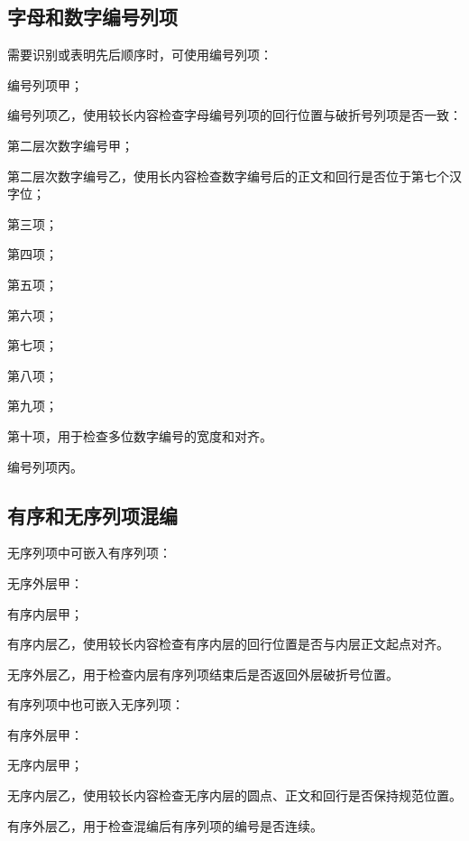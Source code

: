 \subsection{字母和数字编号列项}
需要识别或表明先后顺序时，可使用编号列项：
\begin{stdenum}
    \item 编号列项甲；
    \item 编号列项乙，使用较长内容检查字母编号列项的回行位置与破折号列项是否一致：
    \begin{stdenum}
        \item 第二层次数字编号甲；
        \item 第二层次数字编号乙，使用长内容检查数字编号后的正文和回行是否位于第七个汉字位；
        \item 第三项；
        \item 第四项；
        \item 第五项；
        \item 第六项；
        \item 第七项；
        \item 第八项；
        \item 第九项；
        \item 第十项，用于检查多位数字编号的宽度和对齐。
    \end{stdenum}
    \item 编号列项丙。
\end{stdenum}

\subsection{有序和无序列项混编}
无序列项中可嵌入有序列项：
\begin{stdlist}
    \item 无序外层甲：
    \begin{stdenum}
        \item 有序内层甲；
        \item 有序内层乙，使用较长内容检查有序内层的回行位置是否与内层正文起点对齐。
    \end{stdenum}
    \item 无序外层乙，用于检查内层有序列项结束后是否返回外层破折号位置。
\end{stdlist}

有序列项中也可嵌入无序列项：
\begin{stdenum}
    \item 有序外层甲：
    \begin{stdlist}
        \item 无序内层甲；
        \item 无序内层乙，使用较长内容检查无序内层的圆点、正文和回行是否保持规范位置。
    \end{stdlist}
    \item 有序外层乙，用于检查混编后有序列项的编号是否连续。
\end{stdenum}

